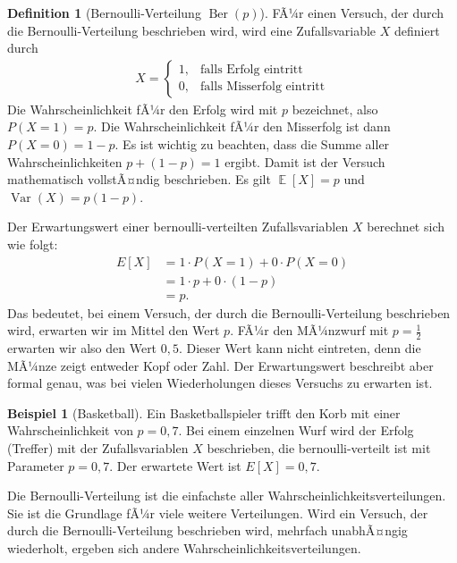 ﻿\documentclass[12pt,a4paper]{article}
\theoremstyle{definition}
\newtheorem{definition}{Definition}[section]
\newtheorem{beispiel}{Beispiel}[section]
\theoremstyle{plain}
\theoremstyle{remark}
\DeclareMathOperator{\E}{\mathbb{E}}
\DeclareMathOperator{\Var}{Var}
\begin{document}
\begin{definition}[Bernoulli-Verteilung $\operatorname{Ber}(p)$]\label{def:bernoulli}
  FÃ¼r einen Versuch, der durch die Bernoulli-Verteilung beschrieben wird,
  wird eine Zufallsvariable $X$ definiert durch
  \begin{align}
    X =
    \begin{cases}
      1, & \text{falls Erfolg eintritt} \\
      0, & \text{falls Misserfolg eintritt}
    \end{cases}
  \end{align}
  Die Wahrscheinlichkeit fÃ¼r den Erfolg wird mit $p$ bezeichnet, also
  $P(X = 1) = p$. Die Wahrscheinlichkeit fÃ¼r den Misserfolg ist dann
  $P(X = 0) = 1 - p$. Es ist wichtig zu beachten, dass die Summe aller
  Wahrscheinlichkeiten $p + (1-p) = 1$ ergibt. Damit ist der Versuch
  mathematisch vollstÃ¤ndig beschrieben. Es gilt
  $\E[X] = p$ und $\Var(X) = p(1-p)$.
\end{definition}

Der Erwartungswert einer bernoulli-verteilten Zufallsvariablen $X$ berechnet
sich wie folgt:
\begin{align}
  E[X] &= 1 \cdot P(X = 1) + 0 \cdot P(X = 0) \\
       &= 1 \cdot p + 0 \cdot (1-p) \\
       &= p.
\end{align}
Das bedeutet, bei einem Versuch, der durch die Bernoulli-Verteilung beschrieben
wird, erwarten wir im Mittel den Wert $p$. FÃ¼r den MÃ¼nzwurf mit
$p = \frac{1}{2}$ erwarten wir also den Wert $0{,}5$. Dieser Wert kann nicht
eintreten, denn die MÃ¼nze zeigt entweder Kopf oder Zahl. Der Erwartungswert
beschreibt aber formal genau, was bei vielen Wiederholungen dieses Versuchs
zu erwarten ist.

\begin{beispiel}[Basketball]\label{bsp:basketball}
  Ein Basketballspieler trifft den Korb mit einer Wahrscheinlichkeit von
  $p = 0{,}7$. Bei einem einzelnen Wurf wird der Erfolg (Treffer) mit der
  Zufallsvariablen $X$ beschrieben, die bernoulli-verteilt ist mit Parameter
  $p = 0{,}7$. Der erwartete Wert ist $E[X] = 0{,}7$.
\end{beispiel}

Die Bernoulli-Verteilung ist die einfachste aller Wahrscheinlichkeitsverteilungen.
Sie ist die Grundlage fÃ¼r viele weitere Verteilungen. Wird ein Versuch, der
durch die Bernoulli-Verteilung beschrieben wird, mehrfach unabhÃ¤ngig
wiederholt, ergeben sich andere Wahrscheinlichkeitsverteilungen.
\end{document}
